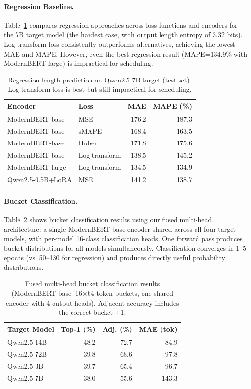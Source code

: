 \documentclass[letterpaper, anonymous, twocolumn, 10pt]{article}
\begin{document}
\paragraph{Regression Baseline.}
Table~\ref{tab:regression_comparison} compares regression approaches across loss functions and encoders for the 7B target model (the hardest case, with output length entropy of 3.32 bits).
Log-transform loss consistently outperforms alternatives, achieving the lowest MAE and MAPE.
However, even the best regression result (MAPE=134.9\% with ModernBERT-large) is impractical for scheduling.

\begin{table}[t]
\centering
\small
\caption{Regression length prediction on Qwen2.5-7B target (test set). Log-transform loss is best but still impractical for scheduling.}
\label{tab:regression_comparison}
\begin{tabular}{llrr}
\hline
Encoder & Loss & MAE & MAPE (\%) \\
\hline
ModernBERT-base & MSE & 176.2 & 187.3 \\
ModernBERT-base & sMAPE & 168.4 & 163.5 \\
ModernBERT-base & Huber & 171.8 & 175.6 \\
ModernBERT-base & Log-transform & 138.5 & 145.2 \\
ModernBERT-large & Log-transform & 134.5 & 134.9 \\
Qwen2.5-0.5B+LoRA & MSE & 141.2 & 138.7 \\
\hline
\end{tabular}
\end{table}

\paragraph{Bucket Classification.}
Table~\ref{tab:bucket_results} shows bucket classification results using our fused multi-head architecture: a single ModernBERT-base encoder shared across all four target models, with per-model 16-class classification heads. One forward pass produces bucket distributions for all models simultaneously.
Classification converges in 1--5 epochs (vs. 50--130 for regression) and produces directly useful probability distributions.

\begin{table}[t]
\centering
\small
\caption{Fused multi-head bucket classification results (ModernBERT-base, 16$\times$64-token buckets, one shared encoder with 4 output heads). Adjacent accuracy includes the correct bucket $\pm$1.}
\label{tab:bucket_results}
\begin{tabular}{lrrr}
\hline
Target Model & Top-1 (\%) & Adj. (\%) & MAE (tok) \\
\hline
Qwen2.5-14B & 48.2 & 72.7 & 84.9 \\
Qwen2.5-72B & 39.8 & 68.6 & 97.8 \\
Qwen2.5-3B & 39.7 & 65.4 & 96.7 \\
Qwen2.5-7B & 38.0 & 55.6 & 143.3 \\
\hline
\end{tabular}
\end{table}
\end{document}
